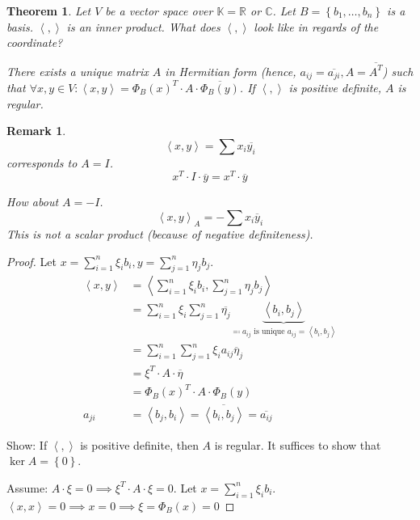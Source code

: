 \documentclass{article}
\newcounter{lecref}[section]
\numberwithin{lecref}{section}
\newtheorem{theorem}[lecref]{Theorem}
\newtheorem{remark}[lecref]{Remark}
\newcommand{\set}[1]{\left\{#1\right\}}
\newcommand{\angel}[1]{\left\langle#1\right\rangle}
\begin{document}
\begin{theorem} %
  Let $V$ be a vector space over $\mathbb K = \mathbb R$ or $\mathbb C$.
  Let $B = \set{b_1, \dots, b_n}$ is a basis.
  $\angel{,}$ is an inner product.
  What does $\angel{,}$ look like in regards of the coordinate?

  There exists a unique matrix $A$ in Hermitian form (hence, $a_{ij} = \overline{a_{ji}}, A = \overline{A^T}$)
  such that $\forall x,y \in V: \angel{x,y} = \Phi_B(x)^T \cdot A \cdot \overline{\Phi_B(y)}$.
  If $\angel{,}$ is positive definite, $A$ is regular.
\end{theorem}

\begin{remark}
  \[ \angel{x,y} = \sum x_i \overline{y_i} \]
  corresponds to $A = I$.
  \[ x^T \cdot I \cdot \overline{y} = x^T \cdot \overline{y} \]

  How about $A = -I$.
  \[ \angel{x,y}_A = -\sum x_i \overline{y}_i \]
  This is not a scalar product (because of negative definiteness).
\end{remark}

\begin{proof}
  Let $x = \sum_{i=1}^n \xi_i b_i, y = \sum_{j=1}^n \eta_j b_{j}$.
  \begin{align*}
    \angel{x,y} &= \angel{\sum_{i=1}^n \xi_i b_i, \sum_{j=1}^n \eta_j b_j} \\
      &= \sum_{i=1}^n \xi_i \sum_{j=1}^n \overline{\eta_j} \underbrace{\angel{b_i, b_j}}_{\eqqcolon a_{ij} \text{ is unique } a_{ij} = \angel{b_i, b_j}} \\
      &= \sum_{i=1}^n \sum_{j=1}^n \xi_i a_{ij} \overline{\eta}_j \\
      &= \xi^T \cdot A \cdot \overline{\eta} \\
      &= \Phi_B(x)^T \cdot A \cdot \Phi_B(y) \\
    a_{ji} &= \angel{b_j, b_i} = \overline{\angel{b_i, b_j}} = \overline{a_{ij}}
  \end{align*}

  Show: If $\angel{,}$ is positive definite, then $A$ is regular.
  It suffices to show that $\operatorname{ker}{A} = \set{0}$.

  Assume: $A \cdot \xi = 0 \implies \xi^T \cdot A \cdot \xi = 0$.
  Let $x = \sum_{i=1}^n \xi_i b_i$. $\angel{x,x} = 0 \implies x = 0 \implies \xi = \Phi_B(x) = 0$
\end{proof}
\end{document}
